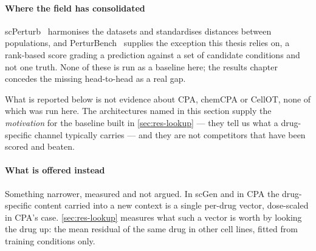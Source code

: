 \begin{figure}[htbp]
\begin{lrbox}{\tvfb}%
%
\end{lrbox}

\end{figure}

\paragraph{Where the field has consolidated}
scPerturb~\cite{scperturb} harmonises the datasets and standardises distances
between populations, and PerturBench~\cite{perturbench} supplies the
exception this thesis relies on, a rank-based score grading a prediction against
a set of candidate conditions and not one truth. None of these is run as a
baseline here; the results chapter concedes the missing head-to-head as a real
gap.

\begin{scopelimit}
What is reported below is not evidence about CPA, chemCPA or CellOT, none of
which was run here. The architectures named in this section supply the
\emph{motivation} for the baseline built in \cref{sec:res-lookup} --- they tell
us what a drug-specific channel typically carries --- and they are not
competitors that have been scored and beaten.
\end{scopelimit}

\paragraph{What is offered instead} Something narrower, measured and not argued.
In scGen and in CPA the drug-specific content carried into a new context is a
single per-drug vector, dose-scaled in CPA's case. \cref{sec:res-lookup}
measures what such a vector is worth by looking the drug up: the mean residual of
the same drug in other cell lines, fitted from training conditions
only.

